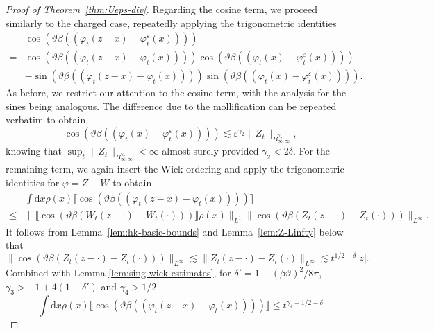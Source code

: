 \documentclass[11pt, a4paper]{scrartcl}
\numberwithin{equation}{section}
\theoremstyle{plain}
\theoremstyle{remark}
\newcommand{\mathd}{\mathrm{d}}
\begin{document}
\begin{proof}[Proof of Theorem~\ref{thm:Ueps-div}]
	Regarding the cosine term, we proceed similarly to the charged case,
	repeatedly applying the trigonometric identities
	\[ \begin{aligned}
			  & \cos (\vartheta \beta ((\varphi_t (z - x) - \varphi_t^{\varepsilon}
			(x))))                                                                  \\
			= & \cos (\vartheta \beta ((\varphi_t (z - x) - \varphi_t
			(x)))) \cos (\vartheta \beta ((\varphi_t (x) - \varphi_t^{\varepsilon}
			(x))))                                                                  \\
			  & - \sin (\vartheta \beta ((\varphi_t (z - x) - \varphi_t (x))))
			\sin (\vartheta \beta ((\varphi_t (x) - \varphi_t^{\varepsilon} (x))))
			.
		\end{aligned} \]
	As before, we restrict our attention to the cosine term, with the analysis for
	the sines being analogous. The difference due to the mollification can be
	repeated verbatim to obtain
	\[ \cos (\vartheta \beta ((\varphi_t (x) - \varphi_t^{\varepsilon} (x))))
		\lesssim \varepsilon^{\gamma_2} \| Z_t \|_{B^{\gamma_2}_{\infty,
						\infty}}, \]
	knowing that $\sup_t \| Z_t \|_{B^{\gamma_2}_{\infty, \infty}} < \infty$
	almost surely provided $\gamma_2 < 2 \delta $. For the remaining term, we
	again insert the Wick ordering and apply the trigonometric identities for
	$\varphi = Z + W$ to obtain
	\begin{equation*}
		\begin{aligned}
			          & \int \mathd x \rho (x) \llbracket \cos (\vartheta \beta ((\varphi_t (z -
			x) - \varphi_t (x)))) \rrbracket                                                     \\
			\leqslant & \| \llbracket \cos (\vartheta \beta  (W_t (z - \cdot) - W_t
			(\cdot))) \rrbracket \rho (x) \|_{L^1}  \| \cos (\vartheta \beta (Z_t (z
			- \cdot) - Z_t (\cdot)) ) \|_{L^{\infty}} .
		\end{aligned}
	\end{equation*}
	It follows from Lemma~\ref{lem:hk-basic-bounds} and Lemma~\ref{lem:Z-Linfty}
	below that
	\[ \| \cos (\vartheta \beta (Z_t (z - \cdot) - Z_t (\cdot)) )
		\|_{L^{\infty}} \lesssim \| Z_t (z - \cdot) - Z_t (\cdot) \|_{L^{\infty}}
		\lesssim t^{1 / 2 - \delta} | z | . \]
	Combined with Lemma \ref{lem:sing-wick-estimates}, for $\delta' = 1 - (\beta
		\vartheta)^2 / 8 \pi$, $\gamma_3 > - 1 + 4 (1 - \delta')$ and $\gamma_4 > 1
		/ 2$
	\[ \int \mathd x \rho (x) \llbracket \cos (\vartheta \beta ((\varphi_t (z -
		x) - \varphi_t (x)))) \rrbracket \leqslant t^{\gamma_4 + 1 / 2 - \delta}
\]
\end{proof}
\end{document}
